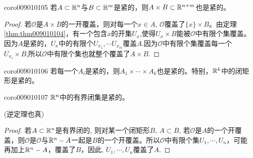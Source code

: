 \begin{corollary}{}{coro009010105}
若$A \subset \mathbb{R}^n$与$B \subset \mathbb{R}^m$是紧的，则$A \times B \subset \mathbb{R}^{n+m}$也是紧的。
\end{corollary}

\begin{proof}
若$\mathscr{O}$是$A \times B$的一开覆盖，则对每一个$x \in A$, $\mathscr{O}$覆盖了$\{x\} \times B$。由定理\ref{thm:thm009010104}，有一个包含$x$的开集$U_x$,使得$U_x \times B$能被$\mathscr{O}$中有限个集覆盖。因为$A$是紧的，$U_x$中的有限个$U_{x_1}, \cdots U_{x_m}$覆盖$A$.因为$\mathscr{O}$中有限个集覆盖每一个$U_{x_i} \times B$,所以$\mathscr{O}$中有限个集也就整个覆盖了$A \times B$.
\end{proof}

\begin{corollary}{}{coro009010106}
若每一个$A_i$是紧的，则$A_1 \times \cdots \times A_k$也是紧的。特别，$\mathbb{R}^k$中的闭矩形是紧的。
\end{corollary}

\begin{corollary}{}{coro009010107}
$\mathbb{R}^n$中的有界闭集是紧的。
\end{corollary}

(逆定理也真)

\begin{proof}
若$A \subset \mathbb{R}^n$是有界闭的, 则对某一个闭矩形$B$, $A \subset B$, 若$\mathscr{O}$是$A$的一个开覆盖，则$\mathscr{O}$是$\mathscr{O}$与$\mathbb{R}^n-A$一起是$B$的一个开覆盖。所以$\mathscr{O}$中有限个集$U_1, \cdots, U_n$，可能再加上$\mathbb{R}^n-A$，覆盖了$B$，因此, $U_1, \cdots, U_n$覆盖了$A$.
\end{proof}

